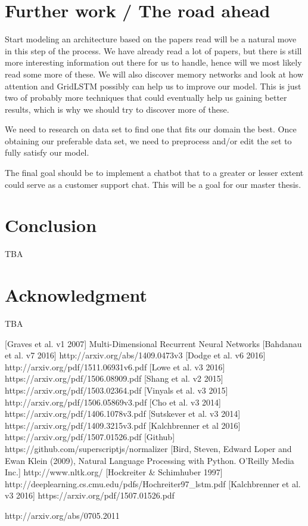 \documentclass{article} %
\begin{document}
\section{Further work / The road ahead}
Start modeling an architecture based on the papers read will be a natural move in this step of the process. We have already read a lot of papers, but there is still more interesting information out there for us to handle, hence will we most likely read some more of these. We will also discover memory networks and look at how attention and GridLSTM possibly can help us to improve our model. This is just two of probably more techniques that could eventually help us gaining better results, which is why we should try to discover more of these.

We need to research on data set to find one that fits our domain the best. Once obtaining our preferable data set, we need to preprocess and/or edit the set to fully satisfy our model.

The final goal should be to implement a chatbot that to a greater or lesser extent could serve as a customer support chat. This will be a goal for our master thesis.

\section{Conclusion}
TBA
\section{Acknowledgment}
TBA
\begin{thebibliography}{1}
[Graves et al. v1 2007] Multi-Dimensional Recurrent Neural Networks
[Bahdanau et al. v7 2016] http://arxiv.org/abs/1409.0473v3
[Dodge et al. v6 2016] http://arxiv.org/pdf/1511.06931v6.pdf
[Lowe et al. v3 2016] https://arxiv.org/pdf/1506.08909.pdf
[Shang et al. v2 2015] https://arxiv.org/pdf/1503.02364.pdf
[Vinyals et al. v3 2015] http://arxiv.org/pdf/1506.05869v3.pdf
[Cho et al. v3 2014] https://arxiv.org/pdf/1406.1078v3.pdf
[Sutskever et al. v3 2014] https://arxiv.org/pdf/1409.3215v3.pdf
[Kalchbrenner et al 2016] https://arxiv.org/pdf/1507.01526.pdf
[Github] https://github.com/superscriptjs/normalizer
[Bird, Steven, Edward Loper and Ewan Klein (2009), Natural Language Processing with Python. O’Reilly Media Inc.] http://www.nltk.org/
[Hockreiter \& Schimhuber 1997] http://deeplearning.cs.cmu.edu/pdfs/Hochreiter97\_lstm.pdf
[Kalchbrenner et al. v3 2016] https://arxiv.org/pdf/1507.01526.pdf

\end{thebibliography} http://arxiv.org/abs/0705.2011
\end{document}
